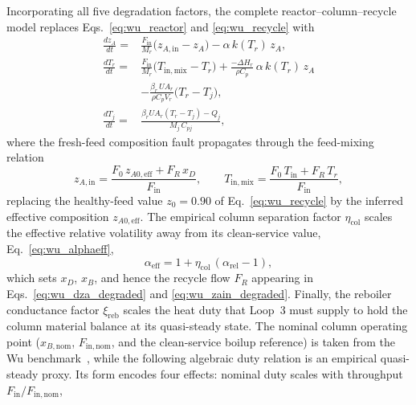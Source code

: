 \documentclass[aps,pre,twocolumn,superscriptaddress,floatfix]{revtex4-2}
\begin{document}
Incorporating all five degradation factors, the complete reactor--column--recycle
model replaces Eqs.~\eqref{eq:wu_reactor} and \eqref{eq:wu_recycle} with
%
\begin{subequations}
\label{eq:wu_degraded}
\begin{align}
  \frac{dz_A}{dt}
    =& \frac{F_\mathrm{in}}{M_r}\bigl(z_{A,\mathrm{in}} - z_A\bigr)
       - \alpha\,k(T_r)\,z_A,
  \label{eq:wu_dza_degraded} \\[4pt]
  \frac{dT_r}{dt}
    =& \frac{F_\mathrm{in}}{M_r}\bigl(T_\mathrm{in,mix} - T_r\bigr)
       + \frac{-\Delta H_r}{\rho C_p}\,\alpha\,k(T_r)\,z_A \nonumber \\
     & - \frac{\beta_r\,U\!A_r}{\rho C_p V_r}\bigl(T_r - T_j\bigr),
  \label{eq:wu_dtr_degraded} \\[4pt]
  \frac{dT_j}{dt}
    =& \frac{\beta_r U\!A_r(T_r - T_j) - Q_j}{M_j\,C_{pj}},
  \label{eq:wu_dtj_degraded}
\end{align}
\end{subequations}
%
where the fresh-feed composition fault propagates through the feed-mixing relation
%
\begin{equation*}
  z_{A,\mathrm{in}} = \frac{F_0\,z_{A0,\mathrm{eff}} + F_R\,x_D}{F_\mathrm{in}},
  \qquad
  T_\mathrm{in,mix} = \frac{F_0\,T_\mathrm{in} + F_R\,T_r}{F_\mathrm{in}},
  \label{eq:wu_zain_degraded}
\end{equation*}
%
replacing the healthy-feed value $z_0 = 0.90$ of Eq.~\eqref{eq:wu_recycle} by the inferred effective composition $z_{A0,\mathrm{eff}}$.  The empirical column separation
factor $\eta_\mathrm{col}$ scales the effective relative volatility away from its clean-service value, Eq.~\eqref{eq:wu_alphaeff},
%
\begin{equation}
  \alpha_\mathrm{eff} = 1 + \eta_\mathrm{col}\,(\alpha_\mathrm{rel} - 1),
  \label{eq:wu_alphaeff_degraded}
\end{equation}
%
which sets $x_D$, $x_B$, and hence the recycle flow $F_R$ appearing in Eqs.~\eqref{eq:wu_dza_degraded} and \eqref{eq:wu_zain_degraded}.  Finally, the
reboiler conductance factor $\xi_\mathrm{reb}$ scales the heat duty that Loop~3 must 
supply to hold the
column material balance at its quasi-steady state. 
The nominal column operating point ($x_{B,\mathrm{nom}}$, $F_{\mathrm{in,nom}}$, and the clean-service
boilup reference) is taken from the Wu benchmark~\citep{Wu2003}, while the following algebraic duty relation
is an empirical quasi-steady proxy. 
Its form encodes four effects: nominal duty scales with throughput $F_\mathrm{in}/F_{\mathrm{in,nom}}$, 
\end{document}
